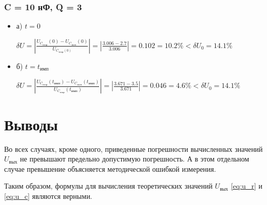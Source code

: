 \documentclass[a4paper,14pt]{extarticle}
\begin{document}
\subsubsection{C = 10 нФ, Q = 3}

\begin{itemize}
\item[] а) $t = 0$

	$\delta U = \left| \frac{U_{C_\text{теор}}(0) - U_{C_\text{эксп}}(0)}{U_{C_\text{теор}(0)}} \right| = \left| \frac{3.006 - 2.7}{3.006} \right| = 0.102 = 10.2\% < \delta U_0 = 14.1\%$

\item[] б) $t = t_\text{имп}$

	$\delta U = \left| \frac{U_{C_\text{теор}}(t_\text{имп}) - U_{C_\text{эксп}}(t_\text{имп})}{U_{C_\text{теор}}(t_\text{имп})} \right| = \left| \frac{3.671 - 3.5}{3.671} \right| = 0.046 = 4.6\% < \delta U_0 = 14.1\%$
\end{itemize}
  
\section{Выводы}

Во всех случаях, кроме одного, приведенные погрешности вычисленных значений $U_\text{вых}$ не превышают предельно допустимую погрешность. А в этом отдельном случае превышение объясняется методической ошибкой измерения.

Таким образом, формулы для вычисления теоретических значений $U_\text{вых}$ \ref{eq:u_r} и \ref{eq:u_c} являются верными.
\end{document}
